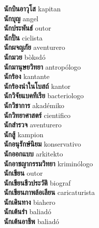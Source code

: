 \textbf{ นักบินอาวุโส  } kapitan \\
\textbf{ นักบุญ  } angel \\
\textbf{ นักประพันธ์  } outor \\
\textbf{ นักปั่น  } ciclista \\
\textbf{ นักผจญภัย  } aventurero \\
\textbf{ นักมวย  } bòksdó \\
\textbf{ นักมานุษยวิทยา  } antropólogo \\
\textbf{ นักร้อง  } kantante \\
\textbf{ นักร้องนำในโบสถ์  } kantor \\
\textbf{ นักวิจัยแบคทีเรีย  } bacteriologo \\
\textbf{ นักวิชาการ  } akadémiko \\
\textbf{ นักวิทยาศาสตร์  } cientifico \\
\textbf{ นักสำรวจ  } aventurero \\
\textbf{ นักสู้  } kampion \\
\textbf{ นักอนุรักษ์นิยม  } konservativo \\
\textbf{ นักออกแบบ  } arkitekto \\
\textbf{ นักอาชญากรรมวิทยา  } kriminólogo \\
\textbf{ นักเขียน  } outor \\
\textbf{ นักเขียนชีวประวัติ  } biograf \\
\textbf{ นักเขียนภาพล้อเลียน  } caricaturista \\
\textbf{ นักเดินทาง  } biahero \\
\textbf{ นักเต้นรำ  } baliadó \\
\textbf{ นักเต้นอาชีพ  } baliadó \\
